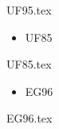 \documentclass{beamer}
\begin{document}
{UF95.tex}


\begin{frame}[t]{}
\tableofcontents
\huge
\begin{itemize}
\huge \item UF85
\end{itemize}
\end{frame}

{UF85.tex}


\begin{frame}[t]{}
\tableofcontents
\huge
\begin{itemize}
\huge \item EG96
\end{itemize}
\end{frame}

{EG96.tex}
\end{document}
